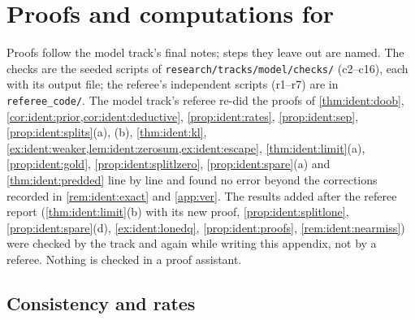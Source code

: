 
\section{Proofs and computations for \texorpdfstring{}{Section 4}}\label{app:ident}

Proofs follow the model track's final notes; steps they leave out are named. The checks are the seeded scripts of \texttt{research/tracks/model/checks/} (c2--c16), each with its output file; the referee's independent scripts (r1--r7) are in \texttt{referee\_code/}. The model track's referee re-did the proofs of \cref{thm:ident:doob}, \cref{cor:ident:prior,cor:ident:deductive}, \cref{prop:ident:rates}, \cref{prop:ident:sep}, \cref{prop:ident:splits}(a), (b), \cref{thm:ident:kl}, \cref{ex:ident:weaker,lem:ident:zerosum,ex:ident:escape}, \cref{thm:ident:limit}(a), \cref{prop:ident:gold}, \cref{prop:ident:splitlzero}, \cref{prop:ident:spare}(a) and \cref{thm:ident:predded} line by line and found no error beyond the corrections recorded in \cref{rem:ident:exact} and \cref{app:ver}. The results added after the referee report (\cref{thm:ident:limit}(b) with its new proof, \cref{prop:ident:splitlone}, \cref{prop:ident:spare}(d), \cref{ex:ident:lonedq}, \cref{prop:ident:proofs}, \cref{rem:ident:nearmiss}) were checked by the track and again while writing this appendix, not by a referee. Nothing is checked in a proof assistant.

\subsection{Consistency and rates}\label{app:ident:doob}

